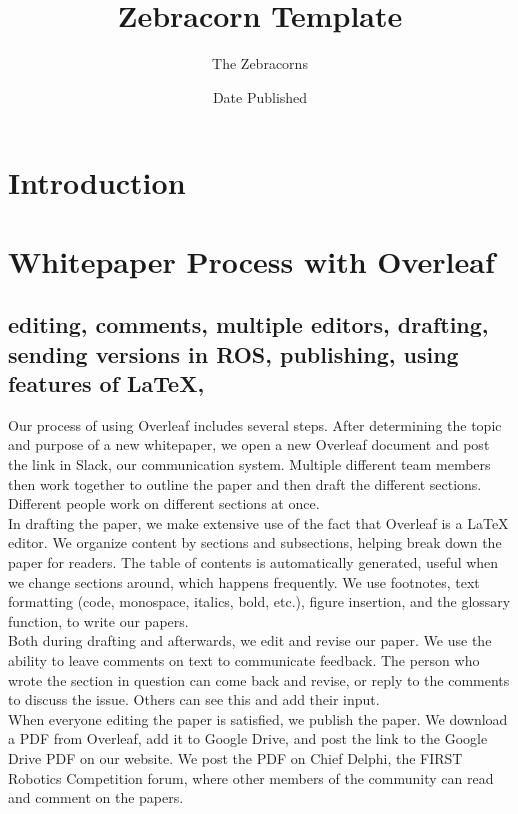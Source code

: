 \documentclass{zebracorns}
\title{Zebracorn Template}
\author{The Zebracorns}
\date{Date Published}
\begin{document}
\maketitle

\section{Introduction}


\section{Whitepaper Process with Overleaf}
\subsection{editing, comments, multiple editors, drafting, sending versions in ROS, publishing, using features of LaTeX, }
Our process of using Overleaf includes several steps. After determining the topic and purpose of a new whitepaper, we open a new Overleaf document and post the link in Slack, our communication system. Multiple different team members then work together to outline the paper and then draft the different sections. Different people work on different sections at once.\\

In drafting the paper, we make extensive use of the fact that Overleaf is a LaTeX editor. We organize content by sections and subsections, helping break down the paper for readers. The table of contents is automatically generated, useful when we change sections around, which happens frequently. We use footnotes, text formatting (code, monospace, italics, bold, etc.), figure insertion, and the glossary function, to write our papers.\\

Both during drafting and afterwards, we edit and revise our paper. We use the ability to leave comments on text to communicate feedback. The person who wrote the section in question can come back and revise, or reply to the comments to discuss the issue. Others can see this and add their input.\\

When everyone editing the paper is satisfied, we publish the paper. We download a PDF from Overleaf, add it to Google Drive, and post the link to the Google Drive PDF on our website. We post the PDF on Chief Delphi, the FIRST Robotics Competition forum, where other members of the community can read and comment on the papers.\\
\end{document}
